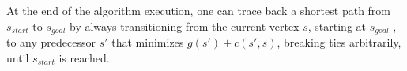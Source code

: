 \documentclass[10pt,journal]{IEEEtran}
\begin{document}
At the end of the algorithm execution, one can trace back a shortest path from $s_{start}$ to $s_{goal}$ by always transitioning from the current vertex $s$, starting at $s_{goal}$ , to any predecessor $s'$ that minimizes $g(s') + c(s',s)$, breaking ties arbitrarily, until $s_{start}$ is reached.

%
%
\end{document}
